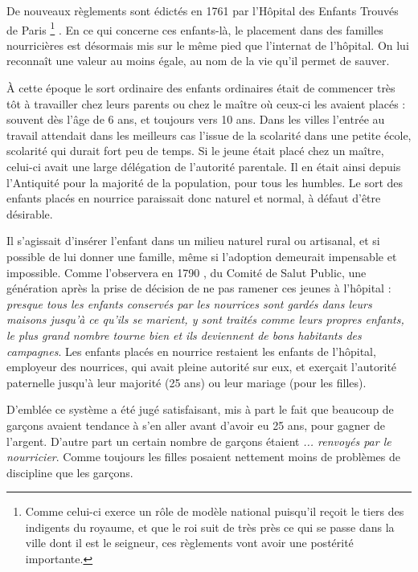  De nouveaux règlements sont édictés en 1761 par l'Hôpital des Enfants Trouvés de Paris
\footnote{Comme celui-ci exerce un rôle de modèle national puisqu'il reçoit le tiers des indigents du royaume, et que le roi suit de très près ce qui se passe dans la ville dont il est le seigneur, ces règlements vont avoir une postérité importante.}%
. En ce qui concerne ces enfants-là, le placement dans des familles nourricières est désormais mis sur le même pied que l'internat de l'hôpital. On lui reconnaît une valeur au moins égale, au nom de la vie qu'il permet de sauver. 

 À cette époque le sort ordinaire des enfants ordinaires était de commencer très tôt à travailler chez leurs parents ou chez le maître où ceux-ci les avaient placés : souvent dès l'âge de 6 ans, et toujours vers 10 ans. Dans les villes l'entrée au travail attendait dans les meilleurs cas l'issue de la scolarité dans une petite école, scolarité qui durait fort peu de temps. Si le jeune était placé chez un maître, celui-ci avait une large délégation de l'autorité parentale. Il en était ainsi depuis l'Antiquité pour la majorité de la population, pour tous les humbles. Le sort des enfants placés en nourrice paraissait donc naturel et normal, à défaut d'être désirable.

 Il s'agissait d'insérer l'enfant dans un milieu naturel rural ou artisanal, et si possible de lui donner une famille, même si l'adoption demeurait impensable et impossible. Comme l'observera en 1790 , du Comité de Salut Public, une génération après la prise de décision de ne pas ramener ces jeunes à l'hôpital : \emph{presque tous les enfants conservés par les nourrices sont gardés dans leurs maisons jusqu'à ce qu'ils se marient, y sont traités comme leurs propres enfants, le plus grand nombre tourne bien et ils deviennent de bons habitants des campagnes}. Les enfants placés en nourrice restaient les enfants de l'hôpital, employeur des nourrices, qui avait pleine autorité sur eux, et exerçait l'autorité paternelle jusqu'à leur majorité (25 ans) ou leur mariage (pour les filles). 

 D'emblée ce système a été jugé satisfaisant, mis à part le fait que beaucoup de garçons avaient tendance à s'en aller avant d'avoir eu 25 ans, pour gagner de l'argent. D'autre part un certain nombre de garçons étaient \emph{... renvoyés par le nourricier}. Comme toujours les filles posaient nettement moins de problèmes de discipline que les garçons. 

